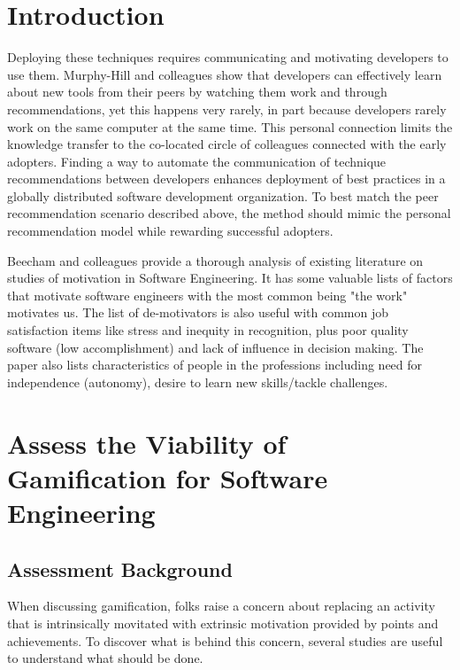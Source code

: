 \documentclass{sig-alternate}
\begin{document}


\section{Introduction}
Deploying these techniques requires communicating and motivating developers to use them.  Murphy-Hill and colleagues  \cite{wbsnipes:Hill2011Peer} show that developers can effectively learn about new tools from their peers by watching them work and through recommendations, yet this happens very rarely, in part because developers rarely work on the same computer at the same time.  This personal connection limits the knowledge transfer to the co-located circle of colleagues connected with the early adopters.  
Finding a way to automate the communication of technique recommendations between developers enhances deployment of best practices in a globally distributed software development organization.   
To best match the peer recommendation scenario described above, the method should mimic the personal recommendation model while rewarding successful adopters.

Beecham and colleagues provide a thorough analysis of existing literature on studies of motivation in Software Engineering\cite{wbsnipes:Beecham2008Motivation}. It has some valuable lists of factors that motivate software engineers with the most common being "the work" motivates us. The list of de-motivators is also useful with common job satisfaction items like stress and inequity in recognition, plus poor quality software (low accomplishment) and lack of influence in decision making. The paper also lists characteristics of people in the professions including need for independence (autonomy), desire to learn new skills/tackle challenges. 

\section{Assess the Viability of Gamification for Software Engineering}

\subsection{Assessment Background}
When discussing gamification, folks raise a concern about replacing an activity that is intrinsically movitated with extrinsic motivation provided by points and achievements.  To discover what is behind this concern, several studies are useful to understand what should be done. 
\end{document}
